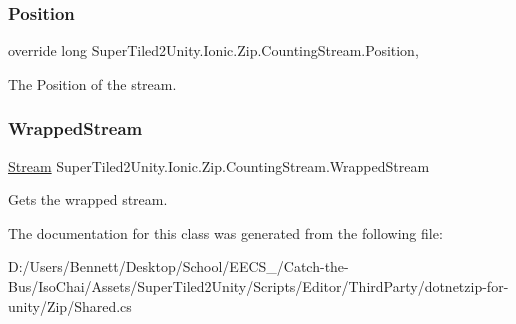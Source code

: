 \subsubsection{\texorpdfstring{Position}{Position}}
{\footnotesize\ttfamily override long Super\+Tiled2\+Unity.\+Ionic.\+Zip.\+Counting\+Stream.\+Position\hspace{0.3cm}{\ttfamily [get]}, {\ttfamily [set]}}



The Position of the stream. 

\mbox{\label{class_super_tiled2_unity_1_1_ionic_1_1_zip_1_1_counting_stream_ab24a8adaaf5e421a3e81b33a47ad03d6}} 
\subsubsection{\texorpdfstring{Wrapped\+Stream}{WrappedStream}}
{\footnotesize\ttfamily \mbox{\hyperlink{namespace_super_tiled2_unity_1_1_ionic_1_1_zip_a9ced5352c56e7e0fceff15b534073c83aeae835e83c0494a376229f254f7d3392}{Stream}} Super\+Tiled2\+Unity.\+Ionic.\+Zip.\+Counting\+Stream.\+Wrapped\+Stream\hspace{0.3cm}{\ttfamily [get]}}



Gets the wrapped stream. 



The documentation for this class was generated from the following file\+:\begin{DoxyCompactItemize}
\item 
D\+:/\+Users/\+Bennett/\+Desktop/\+School/\+E\+E\+C\+S\+\_/\+Catch-\/the-\/\+Bus/\+Iso\+Chai/\+Assets/\+Super\+Tiled2\+Unity/\+Scripts/\+Editor/\+Third\+Party/dotnetzip-\/for-\/unity/\+Zip/Shared.\+cs\end{DoxyCompactItemize}

